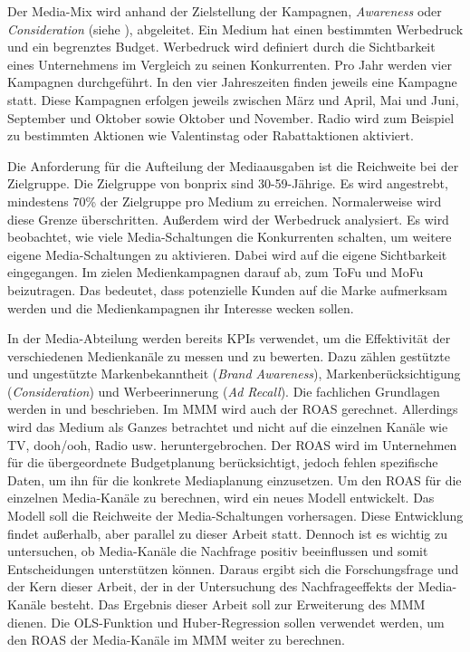 Der Media-Mix wird anhand der Zielstellung der Kampagnen, \textit{Awareness} oder \textit{Consideration} (siehe ), abgeleitet. Ein Medium hat einen bestimmten Werbedruck und ein begrenztes Budget. Werbedruck wird definiert durch die Sichtbarkeit eines Unternehmens im Vergleich zu seinen Konkurrenten. Pro Jahr werden vier Kampagnen durchgeführt. In den vier Jahreszeiten finden jeweils eine Kampagne statt. Diese Kampagnen erfolgen jeweils zwischen März und April, Mai und Juni, September und Oktober sowie Oktober und November. Radio wird zum Beispiel zu bestimmten Aktionen wie Valentinstag oder Rabattaktionen aktiviert.\par
Die Anforderung für die Aufteilung der Mediaausgaben ist die Reichweite bei der Zielgruppe. Die Zielgruppe von bonprix sind 30-59-Jährige. Es wird angestrebt, mindestens 70\% der Zielgruppe pro Medium zu erreichen. Normalerweise wird diese Grenze überschritten. Außerdem wird der Werbedruck analysiert. Es wird beobachtet, wie viele Media-Schaltungen die Konkurrenten schalten, um weitere eigene Media-Schaltungen zu aktivieren. Dabei wird auf die eigene Sichtbarkeit eingegangen. Im  zielen Medienkampagnen darauf ab, zum \ac{ToFu} und \ac{MoFu} beizutragen. Das bedeutet, dass potenzielle Kunden auf die Marke aufmerksam werden und die Medienkampagnen ihr Interesse wecken sollen. \par
In der Media-Abteilung werden bereits \ac{KPI}s verwendet, um die Effektivität der verschiedenen Medienkanäle zu messen und zu bewerten. Dazu zählen gestützte und ungestützte Markenbekanntheit (\textit{Brand Awareness}), Markenberücksichtigung (\textit{Consideration}) und Werbeerinnerung (\textit{Ad Recall}). Die fachlichen Grundlagen werden in  und  beschrieben. Im \ac{MMM} wird auch der \ac{ROAS} gerechnet. Allerdings wird das Medium als Ganzes betrachtet und nicht auf die einzelnen Kanäle wie TV, \ac{dooh}/\ac{ooh}, Radio usw. heruntergebrochen. Der \ac{ROAS} wird im Unternehmen für die übergeordnete Budgetplanung berücksichtigt, jedoch fehlen spezifische Daten, um ihn für die konkrete Mediaplanung einzusetzen. Um den \ac{ROAS} für die einzelnen Media-Kanäle zu berechnen, wird ein neues Modell entwickelt. Das Modell soll die Reichweite der Media-Schaltungen vorhersagen. Diese Entwicklung findet außerhalb, aber parallel zu dieser Arbeit statt. Dennoch ist es wichtig zu untersuchen, ob Media-Kanäle die Nachfrage positiv beeinflussen und somit Entscheidungen unterstützen können. Daraus ergibt sich die Forschungsfrage und der Kern dieser Arbeit, der in der Untersuchung des Nachfrageeffekts der Media-Kanäle besteht. Das Ergebnis dieser Arbeit soll zur Erweiterung des \ac{MMM} dienen. Die \ac{OLS}-Funktion und Huber-Regression sollen verwendet werden, um den \ac{ROAS} der Media-Kanäle im \ac{MMM} weiter zu berechnen. \par
